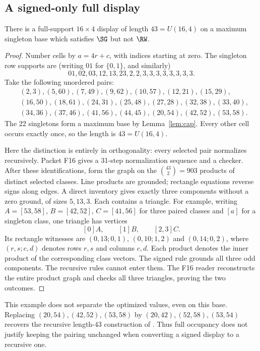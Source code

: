\subsection{A signed-only full display}
\begin{proposition}
\label{prop:full-four-distinction}
There is a full-support $16\times4$ display of length $43=U(16,4)$
on a maximum singleton base which satisfies $\SG$ but not $\RW$.
\end{proposition}
\begin{proof}
Number cells by $a=4r+c$, with indices starting at zero. The singleton
row supports are (writing $01$ for $\{0,1\}$, and similarly)
\[
 01,02,03,12,13,23,2,2,3,3,3,3,3,3,3,3.
\]
Take the following unordered pairs:
\begin{align*}
 &(2,3),(5,60),(7,49),(9,62),(10,57),(12,21),(15,29),\\
 &(16,50),(18,61),(24,31),(25,48),(27,28),(32,38),(33,40),\\
 &(34,36),(37,46),(41,56),(44,45),(20,54),(42,52),(53,58).
\end{align*}
The 22 singletons form a maximum base by Lemma~\ref{lem:cap}.
Every other cell occurs exactly once, so the length is $43=U(16,4)$.

Here the distinction is entirely in orthogonality: every selected pair
normalizes recursively. Packet F16 gives a 31-step normalization
sequence and a checker. After these identifications, form the
graph on the $\binom{43}{2}=903$ products of distinct selected classes.
Line products are grounded; rectangle equations reverse signs along edges.
A direct inventory gives exactly three components without a zero ground,
of sizes $5,13,3$. Each contains a triangle. For example, writing
$A=[53,58]$, $B=[42,52]$, $C=[41,56]$ for three paired classes
and $[a]$ for a singleton class, one triangle has vertices
\[
 [0]A,\qquad [1]B,\qquad [2,3]C.
\]
Its rectangle witnesses are $(0,13;0,1)$, $(0,10;1,2)$ and
$(0,14;0,2)$, where $(r,s;c,d)$ denotes rows $r,s$ and columns $c,d$. Each product denotes the inner product of the corresponding
class vectors. The signed rule grounds all three odd components. The
recursive rules cannot enter them. The F16 reader reconstructs the entire
product graph and checks all three triangles, proving the two outcomes.
\end{proof}

This example does not separate the optimized values, even on this base.
Replacing $(20,54),(42,52),(53,58)$ by
$(20,42),(52,58),(53,54)$ recovers the recursive length-$43$
construction of \cite[Figure~2]{CC}. Thus full occupancy does not justify keeping the pairing unchanged
when converting a signed display to a recursive one.
